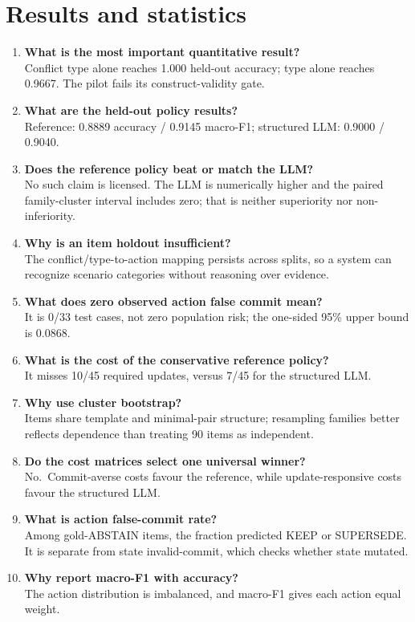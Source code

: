 \section{Results and statistics}\label{results-and-statistics}

\begin{enumerate}
\def\labelenumi{\arabic{enumi}.}
\setcounter{enumi}{20}
\item
  \textbf{What is the most important quantitative result?}\\
  Conflict type alone reaches 1.000 held-out accuracy; type alone
  reaches 0.9667. The pilot fails its construct-validity gate.
\item
  \textbf{What are the held-out policy results?}\\
  Reference: 0.8889 accuracy / 0.9145 macro-F1; structured LLM: 0.9000 /
  0.9040.
\item
  \textbf{Does the reference policy beat or match the LLM?}\\
  No such claim is licensed. The LLM is numerically higher and the
  paired family-cluster interval includes zero; that is neither
  superiority nor non-inferiority.
\item
  \textbf{Why is an item holdout insufficient?}\\
  The conflict/type-to-action mapping persists across splits, so a
  system can recognize scenario categories without reasoning over
  evidence.
\item
  \textbf{What does zero observed action false commit mean?}\\
  It is 0/33 test cases, not zero population risk; the one-sided 95\%
  upper bound is 0.0868.
\item
  \textbf{What is the cost of the conservative reference policy?}\\
  It misses 10/45 required updates, versus 7/45 for the structured LLM.
\item
  \textbf{Why use cluster bootstrap?}\\
  Items share template and minimal-pair structure; resampling families
  better reflects dependence than treating 90 items as independent.
\item
  \textbf{Do the cost matrices select one universal winner?}\\
  No.~Commit-averse costs favour the reference, while update-responsive
  costs favour the structured LLM.
\item
  \textbf{What is action false-commit rate?}\\
  Among gold-ABSTAIN items, the fraction predicted KEEP or SUPERSEDE. It
  is separate from state invalid-commit, which checks whether state
  mutated.
\item
  \textbf{Why report macro-F1 with accuracy?}\\
  The action distribution is imbalanced, and macro-F1 gives each action
  equal weight.
\end{enumerate}

